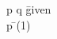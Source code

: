 \documentclass{article}
\begin{document}
\begin{proofbox}
\: p \land q \= \hbox{given} \\
\: p \= \andelim(1) \\
\end{proofbox}
\end{document}
